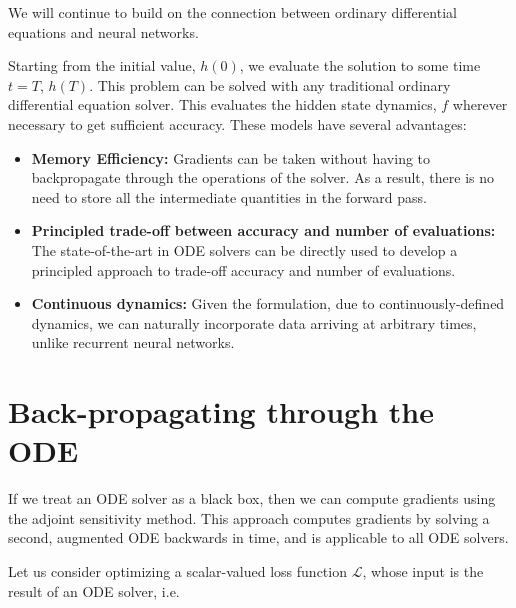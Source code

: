 \documentclass[book.tex]{subfiles}
\begin{document}
We will continue to build on the connection between ordinary differential equations and neural networks. %

Starting from the initial value, $h(0)$, we evaluate the solution to some time $t=T$, $h(T)$.  This problem can be solved with any traditional ordinary differential equation solver.  This evaluates the hidden state dynamics, $f$ wherever necessary to get sufficient accuracy.  These models have several advantages:


\begin{itemize}
    \item \textbf{Memory Efficiency:} Gradients can be taken without having to backpropagate through the operations of the solver.  As a result, there is no need to store all the intermediate quantities in the forward pass.
    \item \textbf{Principled trade-off between accuracy and number of evaluations:} The state-of-the-art in ODE solvers can be directly used to develop a principled approach to trade-off accuracy and number of evaluations.  
    \item \textbf{Continuous dynamics:} Given the formulation, due to continuously-defined dynamics, we can naturally incorporate data arriving at arbitrary times, unlike recurrent neural networks.
\end{itemize}

\section{Back-propagating through the ODE}

If we treat an ODE solver as a black box, then we can compute gradients using the adjoint sensitivity method. This approach computes gradients by solving a second, augmented ODE backwards in time, and is applicable to all ODE solvers. 

Let us consider optimizing a scalar-valued loss function $\mathcal{L}$, whose input is the result of an ODE solver, i.e.
\end{document}
